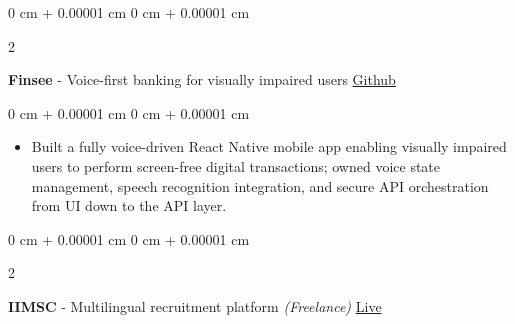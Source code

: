 \documentclass[10pt, letterpaper]{article}
\newenvironment{highlights}{
    \begin{itemize}[
        topsep=0.10 cm,
        parsep=0.10 cm,
        partopsep=0pt,
        itemsep=0pt,
        leftmargin=0 cm + 10pt
    ]
}{
    \end{itemize}
} %
\newenvironment{onecolentry}{
    \begin{adjustwidth}{
        0 cm + 0.00001 cm
    }{
        0 cm + 0.00001 cm
    }
}{
    \end{adjustwidth}
} %
\newenvironment{twocolentry}[2][]{
    \onecolentry
    \def\secondColumn{#2}
    \setcolumnwidth{\fill, 4.5 cm}
    \begin{paracol}{2}
}{
    \switchcolumn \raggedleft \secondColumn
    \end{paracol}
    \endonecolentry
} %
\begin{document}
        \vspace{0.2 cm}




        \begin{twocolentry}{
            \href{https://github.com/vinaypokharkar/finsee}{Github}
        }
            \textbf{Finsee} - Voice-first banking for visually impaired users \end{twocolentry}

        \vspace{0.10 cm}
        \begin{onecolentry}
            \begin{highlights}
                \item Built a fully voice-driven React Native mobile app enabling visually impaired users to perform screen-free digital transactions; owned voice state management, speech recognition integration, and secure API orchestration from UI down to the API layer.
            \end{highlights}
        \end{onecolentry}

        \vspace{0.2 cm}

        \begin{twocolentry}{
            \href{https://www.ii-msc.com}{Live}
        }
            \textbf{IIMSC} - Multilingual recruitment platform \textit{(Freelance)} \end{twocolentry}
\end{document}
